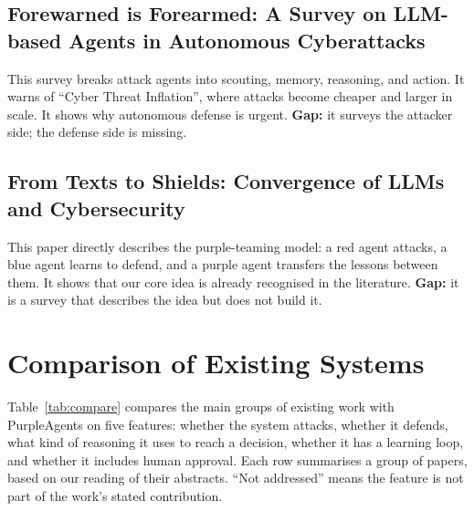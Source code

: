 \subsection{Forewarned is Forearmed: A Survey on LLM-based Agents in Autonomous Cyberattacks}
This survey breaks attack agents into scouting, memory, reasoning, and action. It
warns of ``Cyber Threat Inflation'', where attacks become cheaper and larger in
scale. It shows why autonomous defense is urgent. \textbf{Gap:} it surveys the
attacker side; the defense side is missing.

\subsection{From Texts to Shields: Convergence of LLMs and Cybersecurity}
This paper directly describes the purple-teaming model: a red agent attacks, a
blue agent learns to defend, and a purple agent transfers the lessons between
them. It shows that our core idea is already recognised in the literature.
\textbf{Gap:} it is a survey that describes the idea but does not build it.

\section{Comparison of Existing Systems}

Table~\ref{tab:compare} compares the main groups of existing work with
PurpleAgents on five features: whether the system attacks, whether it defends,
what kind of reasoning it uses to reach a decision, whether it has a learning
loop, and whether it includes human approval. Each row summarises a group of
papers, based on our reading of their abstracts. ``Not addressed'' means the
feature is not part of the work's stated contribution.

